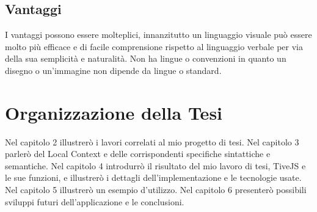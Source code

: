             \subsection{Vantaggi}
                I vantaggi possono essere molteplici, innanzitutto un linguaggio visuale può essere molto più efficace e di facile comprensione rispetto al linguaggio verbale per via della sua semplicità e naturalità. Non ha lingue o convenzioni in quanto un disegno o un'immagine non dipende da lingue o standard.

    \section{Organizzazione della Tesi}
        Nel capitolo 2 illustrerò i lavori correlati al mio progetto di tesi.
        Nel capitolo 3 parlerò del Local Context e delle corrispondenti specifiche sintattiche e semantiche. 
        Nel capitolo 4 introdurrò il risultato del mio lavoro di tesi, TiveJS e le sue funzioni, e illustrerò  i dettagli dell'implementazione e le tecnologie usate. 
        Nel capitolo 5 illustrerò un esempio d'utilizzo. 
        Nel capitolo 6 presenterò possibili sviluppi futuri dell'applicazione e le conclusioni.